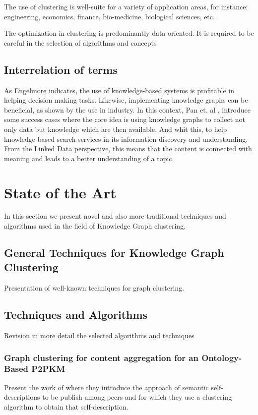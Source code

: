 \documentclass[runningheads]{llncs}
\begin{document}
The use of clustering is well-suite for a variety of application areas, for instance: engineering, economics, finance, bio-medicine, biological sciences, etc. \cite{Pedrycz}.

The optimization in clustering is predominantly data-oriented. \cite{Pedrycz}
It is required to be careful in the selection of algorithms and concepts

\subsection{Interrelation of terms}
As Engelmore \cite{Engelmore} indicates, the use of knowledge-based systems is profitable in helping decision making tasks. Likewise, implementing knowledge graphs can be beneficial, as shown by the use in industry. In this context, Pan et. al \cite{Pan}, introduce some success cases where the core idea is using knowledge graphs to collect not only data but knowledge which are then available. And whit this, to help knowledge-based search services in its information discovery and understanding.
From the Linked Data perspective, this means that the content is connected with meaning and leads to a better understanding of a topic. \cite{Pan}

\section{State of the Art}
In this section we present novel and also more traditional techniques and algorithms used in the field of Knowledge Graph clustering. 


\subsection{General Techniques for Knowledge Graph Clustering}
Presentation of well-known techniques for graph clustering.


\subsection{Techniques and Algorithms}
Revision in more detail the selected algorithms and techniques 


\subsubsection{Graph clustering for content aggregation for an Ontology-Based P2PKM}
Present the work of \cite{Schmitz} where they introduce the approach of semantic self-descriptions to be publish among peers and for which they use a clustering algorithm to obtain that self-description.
\end{document}
